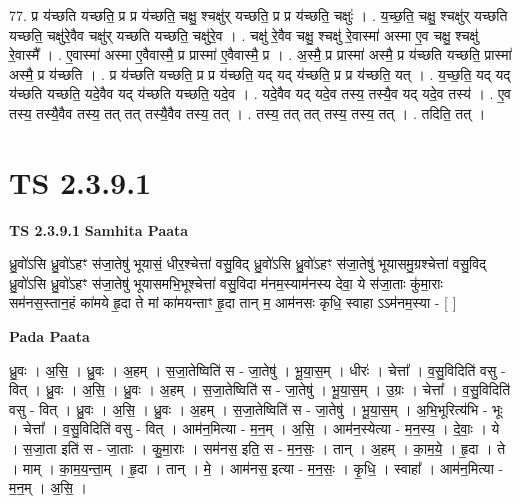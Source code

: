 \documentclass[17pt]{extarticle}
\begin{document}
77. प्र य॑च्छति यच्छति॒ प्र प्र य॑च्छति॒ चक्षु॒ श्चक्षु॑र् यच्छति॒ प्र प्र य॑च्छति॒ चक्षुः॑ । . य॒च्छ॒ति॒ चक्षु॒ श्चक्षु॑र् यच्छति यच्छति॒ चक्षु॑रे॒वैव चक्षु॑र् यच्छति यच्छति॒ चक्षु॑रे॒व । . चक्षु॑ रे॒वैव चक्षु॒ श्चक्षु॑ रे॒वास्मा॑ अस्मा ए॒व चक्षु॒ श्चक्षु॑ रे॒वास्मै᳚ । . ए॒वास्मा॑ अस्मा ए॒वैवास्मै॒ प्र प्रास्मा॑ ए॒वैवास्मै॒ प्र । . अ॒स्मै॒ प्र प्रास्मा॑ अस्मै॒ प्र य॑च्छति यच्छति॒ प्रास्मा॑ अस्मै॒ प्र य॑च्छति । . प्र य॑च्छति यच्छति॒ प्र प्र य॑च्छति॒ यद् यद् य॑च्छति॒ प्र प्र य॑च्छति॒ यत् । . य॒च्छ॒ति॒ यद् यद् य॑च्छति यच्छति॒ यदे॒वैव यद् य॑च्छति यच्छति॒ यदे॒व । . यदे॒वैव यद् यदे॒व तस्य॒ तस्यै॒व यद् यदे॒व तस्य॑ । . ए॒व तस्य॒ तस्यै॒वैव तस्य॒ तत् तत् तस्यै॒वैव तस्य॒ तत् । . तस्य॒ तत् तत् तस्य॒ तस्य॒ तत् । . तदिति॒ तत् । \newline
\pagebreak
{}
\section*{ TS 2.3.9.1 }

\textbf{TS 2.3.9.1 } \newline
\textbf{Samhita Paata} \newline

ध्रु॒वो॑ऽसि ध्रु॒वो॑ऽहꣳ स॑जा॒तेषु॑ भूयासं॒ धीर॒श्चेत्ता॑ वसु॒विद् ध्रु॒वो॑ऽसि ध्रु॒वो॑ऽहꣳ स॑जा॒तेषु॑ भूयासमु॒ग्रश्चेत्ता॑ वसु॒विद् ध्रु॒वो॑ऽसि ध्रु॒वो॑ऽहꣳ स॑जा॒तेषु॑ भूयासमभि॒भूश्चेत्ता॑ वसु॒विदा म॑नम॒स्याम॑नस्य देवा॒ ये स॑जा॒ताः कु॑मा॒राः सम॑नस॒स्तान॒हं का॑मये हृ॒दा ते मां का॑मयन्ताꣳ हृ॒दा तान् म॒ आम॑नसः कृधि॒ स्वाहा ऽऽम॑नम॒स्या - [  ] \newline

\textbf{Pada Paata} \newline

ध्रु॒वः । अ॒सि॒ । ध्रु॒वः । अ॒हम् । स॒जा॒तेष्विति॑ स - जा॒तेषु॑ । भू॒या॒स॒म् । धीरः॑ । चेत्ता᳚ । व॒सु॒विदिति॑ वसु - वित् । ध्रु॒वः । अ॒सि॒ । ध्रु॒वः । अ॒हम् । स॒जा॒तेष्विति॑ स - जा॒तेषु॑ । भू॒या॒स॒म् । उ॒ग्रः । चेत्ता᳚ । व॒सु॒विदिति॑ वसु - वित् । ध्रु॒वः । अ॒सि॒ ।  ध्रु॒वः । अ॒हम् । स॒जा॒तेष्विति॑ स - जा॒तेषु॑ । भू॒या॒स॒म् । अ॒भि॒भूरित्य॑भि - भूः । चेत्ता᳚ । व॒सु॒विदिति॑ वसु - वित् । आम॑न॒मित्या - म॒न॒म् । अ॒सि॒ । आम॑न॒स्येत्या - म॒न॒स्य॒ । दे॒वाः॒ । ये ।  स॒जा॒ता इति॑ स - जा॒ताः । कु॒मा॒राः । सम॑नस॒ इति॒ स - म॒न॒सः॒ । तान् । अ॒हम् । का॒म॒ये॒ । हृ॒दा । ते । माम् । का॒म॒य॒न्ता॒म् । हृ॒दा । तान् । मे॒ । आम॑नस॒ इत्या - म॒न॒सः॒ । कृ॒धि॒ । स्वाहा᳚ । आम॑न॒मित्या - म॒न॒म् । अ॒सि॒ ।  \newline
\end{document}
